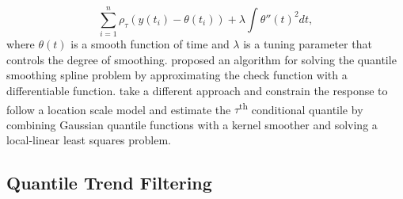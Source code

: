 \documentclass[aoas]{imsart}
\begin{document}
\begin{equation*}
\label{eq:smoothingspline}
\sum_{i=1}^n\rho_{\tau}(y(t_i) - \theta(t_i)) + \lambda\int \theta''(t)^2 dt,
\end{equation*}
where $\theta(t)$ is a smooth function of time and $\lambda$ is a tuning parameter that controls the degree of smoothing. \cite{Oh2011} proposed an algorithm for solving the quantile smoothing spline problem by approximating the check function with a differentiable function. \cite{Racine2017} take a different approach and constrain the response to follow a location scale model and estimate the $\tau$\textsuperscript{th} conditional quantile by combining Gaussian quantile functions with a kernel smoother and solving a local-linear least squares problem. 


\subsection{Quantile Trend Filtering}
\end{document}
